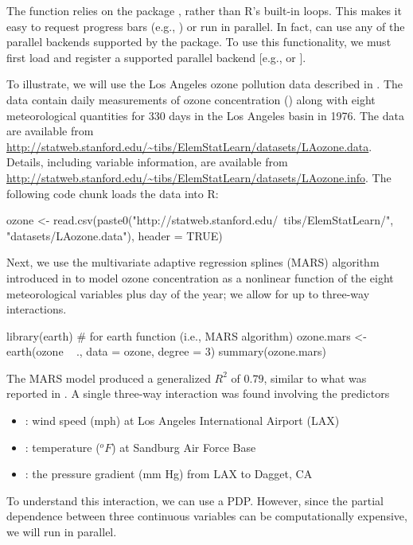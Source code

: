 The  function relies on the  package \citep{plyr-pkg}, rather than R's built-in  loops. This makes it easy to request progress bars (e.g., ) or run  in parallel. In fact,  can use any of the parallel backends supported by the  package. To use this functionality, we must first load and register a supported parallel backend [e.g.,  \citep{doMC-pkg} or  \citep{doParallel-pkg}].

To illustrate, we will use the Los Angeles ozone pollution data described in \citet{breiman-1985-estimating}. The data contain daily measurements of ozone concentration () along with eight meteorological quantities for 330 days in the Los Angeles basin in 1976. The data are available from \url{http://statweb.stanford.edu/~tibs/ElemStatLearn/datasets/LAozone.data}. Details, including variable information, are available from \url{http://statweb.stanford.edu/~tibs/ElemStatLearn/datasets/LAozone.info}. The following code chunk loads the data into R:
\begin{example}
ozone <- read.csv(paste0("http://statweb.stanford.edu/~tibs/ElemStatLearn/",
                         "datasets/LAozone.data"), header = TRUE)
\end{example}

Next, we use the multivariate adaptive regression splines (MARS) algorithm introduced in \citet{friedman-1991-mars} to model ozone concentration as a nonlinear function of the eight meteorological variables plus day of the year; we allow for up to three-way interactions.
\begin{example}
library(earth)  # for earth function (i.e., MARS algorithm)
ozone.mars <- earth(ozone ~ ., data = ozone, degree = 3)
summary(ozone.mars)
\end{example}
The MARS model produced a generalized $R^2$ of $0.79$, similar to what was reported in \citet{breiman-1985-estimating}. A single three-way interaction was found involving the predictors
\begin{itemize}
  \item {}: wind speed (mph) at Los Angeles International Airport (LAX)
  \item {}: temperature ($^oF$) at Sandburg Air Force Base
  \item {}: the pressure gradient (mm Hg) from LAX to Dagget, CA
\end{itemize}
To understand this interaction, we can use a PDP. However, since the partial dependence between three continuous variables can be computationally expensive, we will run  in parallel.

